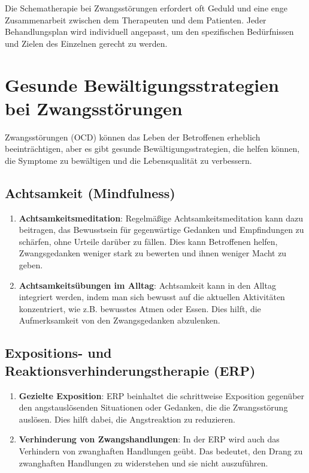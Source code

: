 Die Schematherapie bei Zwangsstörungen erfordert oft Geduld und eine enge Zusammenarbeit zwischen dem Therapeuten und dem Patienten. Jeder Behandlungsplan wird individuell angepasst, um den spezifischen Bedürfnissen und Zielen des Einzelnen gerecht zu werden.

\section{Gesunde Bewältigungsstrategien bei Zwangsstörungen}

Zwangsstörungen (OCD) können das Leben der Betroffenen erheblich beeinträchtigen, aber es gibt gesunde Bewältigungsstrategien, die helfen können, die Symptome zu bewältigen und die Lebensqualität zu verbessern.

\subsection{Achtsamkeit (Mindfulness)}

\begin{enumerate}
  \item \textbf{Achtsamkeitsmeditation}: Regelmäßige Achtsamkeitsmeditation kann dazu beitragen, das Bewusstsein für gegenwärtige Gedanken und Empfindungen zu schärfen, ohne Urteile darüber zu fällen. Dies kann Betroffenen helfen, Zwangsgedanken weniger stark zu bewerten und ihnen weniger Macht zu geben.
  
  \item \textbf{Achtsamkeitsübungen im Alltag}: Achtsamkeit kann in den Alltag integriert werden, indem man sich bewusst auf die aktuellen Aktivitäten konzentriert, wie z.B. bewusstes Atmen oder Essen. Dies hilft, die Aufmerksamkeit von den Zwangsgedanken abzulenken.
\end{enumerate}

\subsection{Expositions- und Reaktionsverhinderungstherapie (ERP)}

\begin{enumerate}
  \item \textbf{Gezielte Exposition}: ERP beinhaltet die schrittweise Exposition gegenüber den angstauslösenden Situationen oder Gedanken, die die Zwangsstörung auslösen. Dies hilft dabei, die Angstreaktion zu reduzieren.
  
  \item \textbf{Verhinderung von Zwangshandlungen}: In der ERP wird auch das Verhindern von zwanghaften Handlungen geübt. Das bedeutet, den Drang zu zwanghaften Handlungen zu widerstehen und sie nicht auszuführen.
\end{enumerate}

